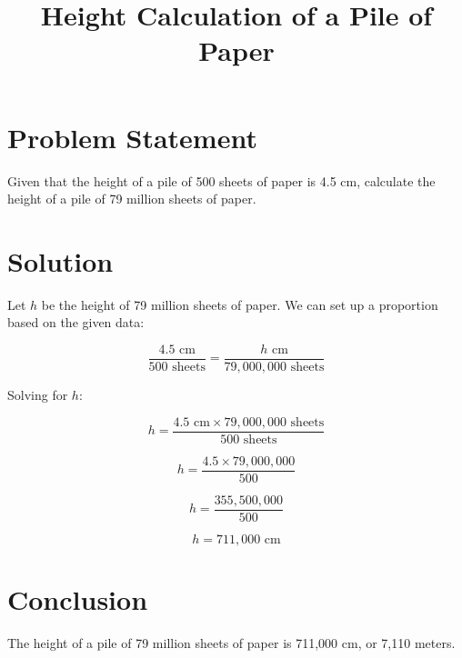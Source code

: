 \documentclass{article}
\begin{document}
\title{Height Calculation of a Pile of Paper}
\author{}
\date{}
\maketitle

\section*{Problem Statement}
Given that the height of a pile of 500 sheets of paper is 4.5 cm, calculate the height of a pile of 79 million sheets of paper.

\section*{Solution}
Let \( h \) be the height of 79 million sheets of paper. We can set up a proportion based on the given data:

\[
\frac{4.5 \text{ cm}}{500 \text{ sheets}} = \frac{h \text{ cm}}{79,000,000 \text{ sheets}}
\]

Solving for \( h \):

\[
h = \frac{4.5 \text{ cm} \times 79,000,000 \text{ sheets}}{500 \text{ sheets}}
\]

\[
h = \frac{4.5 \times 79,000,000}{500}
\]

\[
h = \frac{355,500,000}{500}
\]

\[
h = 711,000 \text{ cm}
\]

\section*{Conclusion}
The height of a pile of 79 million sheets of paper is 711,000 cm, or 7,110 meters.
\end{document}
